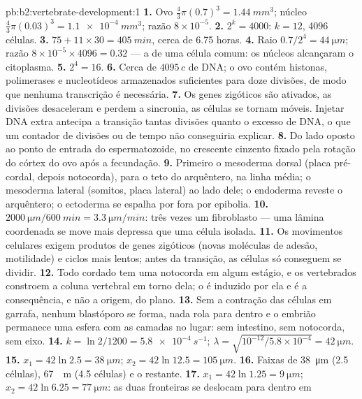 \begin{solution}{pb:b2:vertebrate-development:1}
\textbf{1.} Ovo $\tfrac43\pi(0.7)^{3} = \qty{1.44}{mm^3}$; núcleo
$\tfrac43\pi(0.03)^{3} = \qty{1.1e-4}{mm^3}$; razão $8\times
10^{-5}$.
\textbf{2.} $2^{k} = 4000$: $k = 12$, 4096 células.
\textbf{3.} $75 + 11\times 30 = \qty{405}{min}$, cerca de 6.75 horas.
\textbf{4.} Raio $0.7/2^{4} = \qty{44}{\micro m}$; razão $8\times
10^{-5}\times 4096 = 0.32$ --- a de uma célula comum: os núcleos
alcançaram o citoplasma.
\textbf{5.} $2^{4} = 16$.
\textbf{6.} Cerca de $4095\,c$ de DNA; o ovo contém histonas,
polimerases e nucleotídeos armazenados suficientes para doze divisões,
de modo que nenhuma transcrição é necessária.
\textbf{7.} Os genes zigóticos são ativados, as divisões desaceleram e
perdem a sincronia, as células se tornam móveis. Injetar DNA extra
antecipa a transição tantas divisões quanto o excesso de DNA, o que um
contador de divisões ou de tempo não conseguiria explicar.
\textbf{8.} Do lado oposto ao ponto de entrada do espermatozoide, no
crescente cinzento fixado pela rotação do córtex do ovo após a
fecundação.
\textbf{9.} Primeiro o mesoderma dorsal (placa pré-cordal, depois
notocorda), para o teto do arquêntero, na linha média; o mesoderma
lateral (somitos, placa lateral) ao lado dele; o endoderma reveste o
arquêntero; o ectoderma se espalha por fora por epibolia.
\textbf{10.} $\qty{2000}{\micro m}/\qty{600}{min} = \qty{3.3}{\micro
m/min}$: três vezes um fibroblasto --- uma lâmina coordenada se move
mais depressa que uma célula isolada.
\textbf{11.} Os movimentos celulares exigem produtos de genes
zigóticos (novas moléculas de adesão, motilidade) e ciclos mais lentos;
antes da transição, as células só conseguem se dividir.
\textbf{12.} Todo cordado tem uma notocorda em algum estágio, e os
vertebrados constroem a coluna vertebral em torno dela; o  é
induzido por ela e é a consequência, e não a origem, do plano.
\textbf{13.} Sem a contração das células em garrafa, nenhum blastóporo
se forma, nada rola para dentro e o embrião permanece uma esfera com as
camadas no lugar: sem intestino, sem notocorda, sem eixo.
\textbf{14.} $k = \ln 2/1200 = \qty{5.8e-4}{s^{-1}}$; $\lambda =
\sqrt{10^{-12}/5.8\times 10^{-4}} = \qty{42}{\micro m}$.
\textbf{15.} $x_1 = 42\ln 2.5 = \qty{38}{\micro m}$; $x_2 = 42\ln 12.5
= \qty{105}{\micro m}$.
\textbf{16.} Faixas de \qty{38}{\micro m} (2.5 células), \qty{67}{\micro
m} (4.5 células) e o restante.
\textbf{17.} $x_1 = 42\ln 1.25 = \qty{9}{\micro m}$; $x_2 = 42\ln 6.25
= \qty{77}{\micro m}$: as duas fronteiras se deslocam para dentro em

\end{solution}

